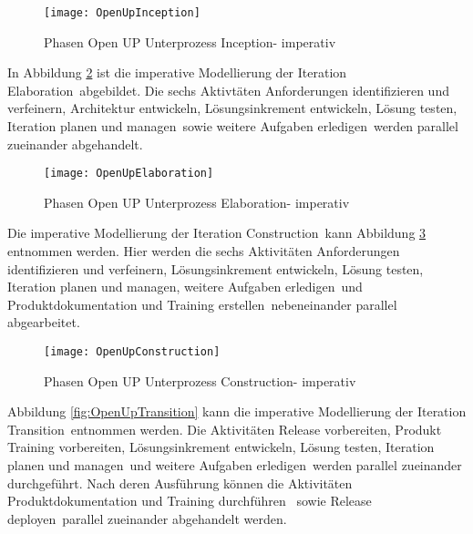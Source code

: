 \begin{figure}[H]
\begin{center}
  \texttt{[image: OpenUpInception]} %
  \caption{Phasen Open UP Unterprozess Inception- imperativ}
  \label{fig:OpenUpInception}
\end{center}
\end{figure}

In Abbildung \ref{fig:OpenUpElaboration} ist die imperative Modellierung der Iteration \grqq Elaboration\grqq \ abgebildet. Die sechs Aktivtäten \grqq Anforderungen identifizieren und verfeinern\grqq , \grqq Architektur entwickeln\grqq, \grqq Lösungsinkrement entwickeln\grqq, \grqq Lösung testen\grqq, \grqq Iteration planen und managen\grqq \ sowie \grqq weitere Aufgaben erledigen\grqq \ werden parallel zueinander abgehandelt.

\begin{figure}[H]
\begin{center}
  \texttt{[image: OpenUpElaboration]} %
  \caption{Phasen Open UP Unterprozess Elaboration- imperativ}
  \label{fig:OpenUpElaboration}
\end{center}
\end{figure}

Die imperative Modellierung der Iteration \grqq Construction\grqq \ kann Abbildung \ref{fig:OpenUpConstruction} entnommen werden. Hier werden die sechs Aktivitäten \grqq Anforderungen identifizieren und verfeinern\grqq, \grqq Lösungsinkrement entwickeln\grqq , \grqq Lösung testen\grqq , \grqq Iteration planen und managen\grqq , \grqq weitere Aufgaben erledigen\grqq  \ und \grqq Produktdokumentation und Training erstellen\grqq \ nebeneinander parallel abgearbeitet.
\begin{figure}[H]
\begin{center}
  \texttt{[image: OpenUpConstruction]} %
  \caption{Phasen Open UP Unterprozess Construction- imperativ}
  \label{fig:OpenUpConstruction}
\end{center}
\end{figure}

Abbildung \ref{fig:OpenUpTransition} kann die imperative Modellierung der Iteration \grqq Transition\grqq \ entnommen werden. Die Aktivitäten \grqq Release vorbereiten\grqq, \grqq  Produkt Training vorbereiten\grqq, \grqq Lösungsinkrement entwickeln\grqq, \grqq Lösung testen\grqq , \grqq Iteration planen und managen\grqq \ und \grqq weitere Aufgaben erledigen\grqq \ werden parallel zueinander durchgeführt. Nach deren Ausführung können die Aktivitäten Produktdokumentation und Training durchführen \grqq \ sowie \grqq Release deployen\grqq \  parallel zueinander abgehandelt werden.


